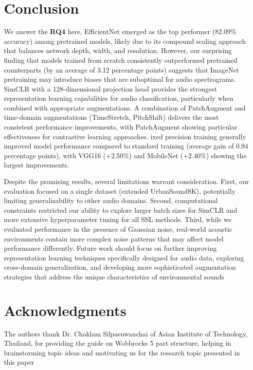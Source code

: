 \documentclass[11pt]{article}
\begin{document}
\section*{Conclusion}
We answer the \textbf{RQ4} here, EfficientNet emerged as the top performer (82.09\% accuracy) among pretrained models, likely due to its compound scaling approach that balances network depth, width, and resolution. However, our surprising finding that models trained from scratch consistently outperformed pretrained counterparts (by an average of 3.12 percentage points) suggests that ImageNet pretraining may introduce biases that are suboptimal for audio spectrograms. SimCLR with a 128-dimensional projection head provides the strongest representation learning capabilities for audio classification, particularly when combined with appropriate augmentations. A combination of PatchAugment and time-domain augmentations (TimeStretch, PitchShift) delivers the most consistent performance improvements, with PatchAugment showing particular effectiveness for contrastive learning approaches. ixed precision training generally improved model performance compared to standard training (average gain of 0.94 percentage points), with VGG16 (+2.50\%) and MobileNet (+2.40\%) showing the largest improvements.

Despite the promising results, several limitations warrant consideration. First, our evaluation focused on a single dataset (extended UrbanSound8K), potentially limiting generalizability to other audio domains. Second, computational constraints restricted our ability to explore larger batch sizes for SimCLR and more extensive hyperparameter tuning for all SSL methods. Third, while we evaluated performance in the presence of Gaussian noise, real-world acoustic environments contain more complex noise patterns that may affect model performance differently.
Future work should focus on further improving representation learning techniques specifically designed for audio data, exploring cross-domain generalization, and developing more sophisticated augmentation strategies that address the unique characteristics of environmental sounds
\section*{Acknowledgments}

The authors thank Dr. Chaklam Silpasuwanchai of Asian Institute of Technology, Thailand, for providing the guide on Wobbrocks 5 part structure, helping in brainstorming topic ideas and motivating us for the research topic presented in this paper
\end{document}
